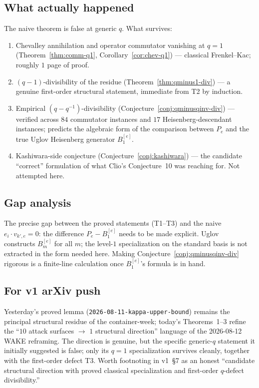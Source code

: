 \documentclass[11pt]{article}
\theoremstyle{definition}
\newcommand{\vke}{v_{k',e}}
\begin{document}
\subsection*{What actually happened}
The naive theorem is false at generic $q$. What survives:
\begin{enumerate}
    \item[T1--T2.] Chevalley annihilation and operator commutator vanishing at $q=1$
        (Theorem~\ref{thm:comm-q1}, Corollary~\ref{cor:chev-q1}) — classical
        Frenkel--Kac; roughly $1$ page of proof.
    \item[T3.] $(q-1)$-divisibility of the residue (Theorem~\ref{thm:qminus1-div})
        --- a genuine first-order structural statement, immediate from T2 by
        induction.
    \item[C4.] Empirical $(q - q^{-1})$-divisibility (Conjecture~\ref{conj:qminusqinv-div})
        --- verified across $84$ commutator instances and $17$ Heisenberg-descendant
        instances; predicts the algebraic form of the comparison between $P_e$
        and the true Uglov Heisenberg generator $B_1^{[e]}$.
    \item[C5.] Kashiwara-side conjecture (Conjecture~\ref{conj:kashiwara}) --- the
        candidate ``correct'' formulation of what Clio's Conjecture~10 was
        reaching for. Not attempted here.
\end{enumerate}

\subsection*{Gap analysis}
The precise gap between the proved statements (T1--T3) and the naive
$e_i \cdot \vke = 0$: the difference $P_e - B_1^{[e]}$ needs to be
made explicit. Uglov~\cite{Uglov} constructs $B_m^{[e]}$ for all $m$; the
level-$1$ specialization on the standard basis is not extracted in the form
needed here. Making Conjecture~\ref{conj:qminusqinv-div} rigorous is a
finite-line calculation once $B_1^{[e]}$'s formula is in hand.

\subsection*{For v1 arXiv push}
Yesterday's proved lemma (\texttt{2026-08-11-kappa-upper-bound}) remains the
principal structural residue of the container-week; today's Theorems~1--3 refine
the ``$10$ attack surfaces $\to$ $1$ structural direction'' language of the
2026-08-12 WAKE reframing. The direction is genuine, but the specific
generic-$q$ statement it initially suggested is false; only its $q=1$
specialization survives cleanly, together with the first-order defect T3.
Worth footnoting in v1~\S7 as an honest ``candidate structural direction with
proved classical specialization and first-order $q$-defect divisibility.''
\end{document}
